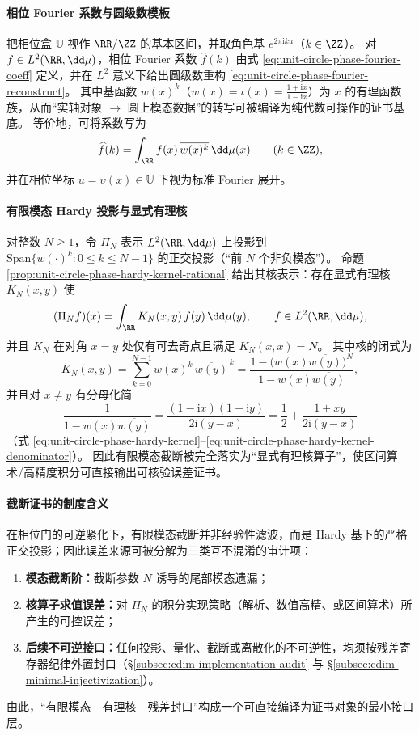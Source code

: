 \paragraph{相位 Fourier 系数与圆级数模板}
把相位盒 \(\mathbb{U}\) 视作 \(\RR/\ZZ\) 的基本区间，并取角色基 \(e^{2\pi\mathrm{i}ku}\)（\(k\in\ZZ\)）。
对 \(f\in L^2(\RR,\dd\mu)\)，相位 Fourier 系数 \(\widehat f(k)\) 由式 \eqref{eq:unit-circle-phase-fourier-coeff} 定义，并在 \(L^2\) 意义下给出圆级数重构 \eqref{eq:unit-circle-phase-fourier-reconstruct}。
其中基函数 \(w(x)^k\)（\(w(x)=\iota(x)=\frac{1+\mathrm{i}x}{1-\mathrm{i}x}\)）为 \(x\) 的有理函数族，从而“实轴对象 \(\to\) 圆上模态数据”的转写可被编译为纯代数可操作的证书基底。
等价地，可将系数写为
\[
\widehat f(k)=\int_{\RR} f(x)\,\overline{w(x)^{k}}\,\dd\mu(x)\qquad(k\in\ZZ),
\]
并在相位坐标 \(u=\upsilon(x)\in\mathbb{U}\) 下视为标准 Fourier 展开。

\paragraph{有限模态 Hardy 投影与显式有理核}
对整数 \(N\ge 1\)，令 \(\Pi_N\) 表示 \(L^2(\RR,\dd\mu)\) 上投影到 \(\mathrm{Span}\{w(\cdot)^k:0\le k\le N-1\}\) 的正交投影（“前 \(N\) 个非负模态”）。
命题 \ref{prop:unit-circle-phase-hardy-kernel-rational} 给出其核表示：存在显式有理核 \(K_N(x,y)\) 使
\[
(\Pi_N f)(x)=\int_{\RR} K_N(x,y)\,f(y)\,\dd\mu(y),
\qquad f\in L^2(\RR,\dd\mu),
\]
并且 \(K_N\) 在对角 \(x=y\) 处仅有可去奇点且满足 \(K_N(x,x)=N\)。
其中核的闭式为
\[
K_N(x,y)=\sum_{k=0}^{N-1}w(x)^k\,\overline{w(y)}^{\,k}
=\frac{1-\bigl(w(x)\overline{w(y)}\bigr)^N}{1-w(x)\overline{w(y)}},
\]
并且对 \(x\neq y\) 有分母化简
\[
\frac{1}{1-w(x)\overline{w(y)}}
=\frac{(1-\mathrm{i}x)(1+\mathrm{i}y)}{2\mathrm{i}(y-x)}
=\frac12+\frac{1+xy}{2\mathrm{i}(y-x)}
\]
（式 \eqref{eq:unit-circle-phase-hardy-kernel}--\eqref{eq:unit-circle-phase-hardy-kernel-denominator}）。
因此有限模态截断被完全落实为“显式有理核算子”，使区间算术/高精度积分可直接输出可核验误差证书。

\paragraph{截断证书的制度含义}
在相位门的可逆紧化下，有限模态截断并非经验性滤波，而是 Hardy 基下的严格正交投影；因此误差来源可被分解为三类互不混淆的审计项：
\begin{enumerate}
  \item \textbf{模态截断阶：}截断参数 \(N\) 诱导的尾部模态遗漏；
  \item \textbf{核算子求值误差：}对 \(\Pi_N\) 的积分实现策略（解析、数值高精、或区间算术）所产生的可控误差；
  \item \textbf{后续不可逆接口：}任何投影、量化、截断或离散化的不可逆性，均须按残差寄存器纪律外置封口（\S\ref{subsec:cdim-implementation-audit} 与 \S\ref{subsec:cdim-minimal-injectivization}）。
\end{enumerate}
由此，“有限模态—有理核—残差封口”构成一个可直接编译为证书对象的最小接口层。


